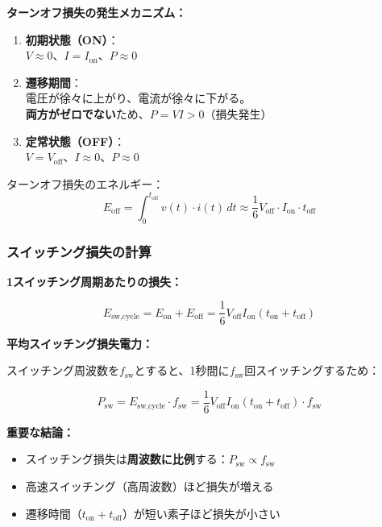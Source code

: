 \begin{screen}
\textbf{ターンオフ損失の発生メカニズム：}

\begin{enumerate}
\item \textbf{初期状態（ON）}：\\
$V \approx 0$、$I = I_{\text{on}}$、$P \approx 0$

\item \textbf{遷移期間}：\\
電圧が徐々に上がり、電流が徐々に下がる。\\
\textbf{両方がゼロでない}ため、$P = VI > 0$（損失発生）

\item \textbf{定常状態（OFF）}：\\
$V = V_{\text{off}}$、$I \approx 0$、$P \approx 0$
\end{enumerate}

ターンオフ損失のエネルギー：
\begin{equation}
E_{\text{off}} = \int_0^{t_{\text{off}}} v(t) \cdot i(t) \, dt \approx \frac{1}{6} V_{\text{off}} \cdot I_{\text{on}} \cdot t_{\text{off}}
\end{equation}
\end{screen}

\subsubsection{スイッチング損失の計算}

\begin{screen}
\textbf{1スイッチング周期あたりの損失：}

\begin{equation}
E_{\text{sw,cycle}} = E_{\text{on}} + E_{\text{off}} = \frac{1}{6} V_{\text{off}} I_{\text{on}} (t_{\text{on}} + t_{\text{off}})
\end{equation}

\textbf{平均スイッチング損失電力：}

スイッチング周波数を$f_{\text{sw}}$とすると、1秒間に$f_{\text{sw}}$回スイッチングするため：

\begin{equation}
\boxed{P_{\text{sw}} = E_{\text{sw,cycle}} \cdot f_{\text{sw}} = \frac{1}{6} V_{\text{off}} I_{\text{on}} (t_{\text{on}} + t_{\text{off}}) \cdot f_{\text{sw}}}
\end{equation}

\textbf{重要な結論：}

\begin{itemize}
\item スイッチング損失は\textbf{周波数に比例}する：$P_{\text{sw}} \propto f_{\text{sw}}$
\item 高速スイッチング（高周波数）ほど損失が増える
\item 遷移時間（$t_{\text{on}} + t_{\text{off}}$）が短い素子ほど損失が小さい
\end{itemize}
\end{screen}

